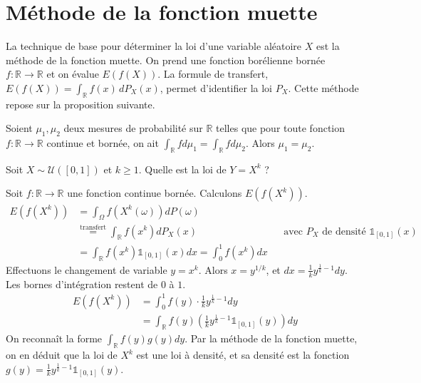 \section{Méthode de la fonction muette}
La technique de base pour déterminer la loi d'une variable aléatoire $X$ est la méthode de la fonction muette. On prend une fonction borélienne bornée $f: \mathbb{R} \to \mathbb{R}$ et on évalue $E(f(X))$. La formule de transfert, $E(f(X)) = \int_{\mathbb{R}} f(x) \,dP_X(x)$, permet d'identifier la loi $P_X$.
Cette méthode repose sur la proposition suivante.
\begin{proposition}
Soient $\mu_1, \mu_2$ deux mesures de probabilité sur $\mathbb{R}$ telles que pour toute fonction $f: \mathbb{R} \to \mathbb{R}$ continue et bornée, on ait $\int_{\mathbb{R}} f d\mu_1 = \int_{\mathbb{R}} f d\mu_2$.
Alors $\mu_1 = \mu_2$.
\end{proposition}
\begin{example}
Soit $X \sim \mathcal{U}([0,1])$ et $k \ge 1$. Quelle est la loi de $Y=X^k$ ?
\end{example}
\begin{solution}
Soit $f: \mathbb{R} \to \mathbb{R}$ une fonction continue bornée. Calculons $E(f(X^k))$.
\begin{align*}
E(f(X^k)) &= \int_{\Omega} f(X^k(\omega)) dP(\omega) && \\
           &\stackrel{\text{transfert}}{=} \int_{\mathbb{R}} f(x^k) dP_X(x) && \text{avec } P_X \text{ de densité } \mathbb{1}_{[0,1]}(x) \\
           &= \int_{\mathbb{R}} f(x^k) \mathbb{1}_{[0,1]}(x) dx = \int_0^1 f(x^k) dx
\end{align*}
Effectuons le changement de variable $y = x^k$. Alors $x = y^{1/k}$, et $dx = \frac{1}{k} y^{\frac{1}{k}-1} dy$. Les bornes d'intégration restent de $0$ à $1$.
\begin{align*}
E(f(X^k)) &= \int_0^1 f(y) \cdot \frac{1}{k} y^{\frac{1}{k}-1} dy \\
           &= \int_{\mathbb{R}} f(y) \left( \frac{1}{k} y^{\frac{1}{k}-1} \mathbb{1}_{[0,1]}(y) \right) dy
\end{align*}
On reconnaît la forme $\int_{\mathbb{R}} f(y) g(y) dy$. Par la méthode de la fonction muette, on en déduit que la loi de $X^k$ est une loi à densité, et sa densité est la fonction $g(y) = \frac{1}{k} y^{\frac{1}{k}-1} \mathbb{1}_{[0,1]}(y)$.
\end{solution}
